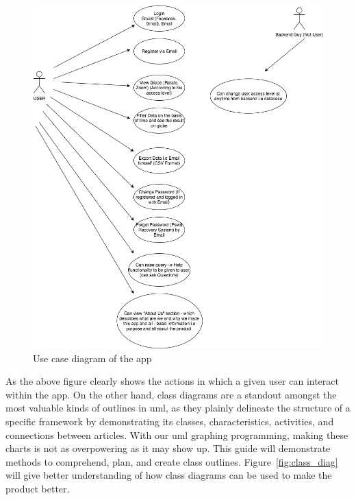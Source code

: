     \begin{figure}[H]
            \centering
            \includegraphics[width=1.0\linewidth]{figures/ch3/usecase.png}
            \caption{\label{fig:use_case} Use case diagram of the app}
    \end{figure}

As the above figure clearly shows the actions in which a given user can interact within the app. On the other hand, class diagrams are a standout amongst the most valuable kinds of outlines in \gls{uml}, as they plainly delineate the structure of a specific framework by demonstrating its classes, characteristics, activities, and connections between articles. With our \gls{uml} graphing programming, making these charts is not as overpowering as it may show up. This guide will demonstrate methods to comprehend, plan, and create class outlines. Figure~\ref{fig:class_diag} will give better understanding of how class diagrams can be used to make the product better.


